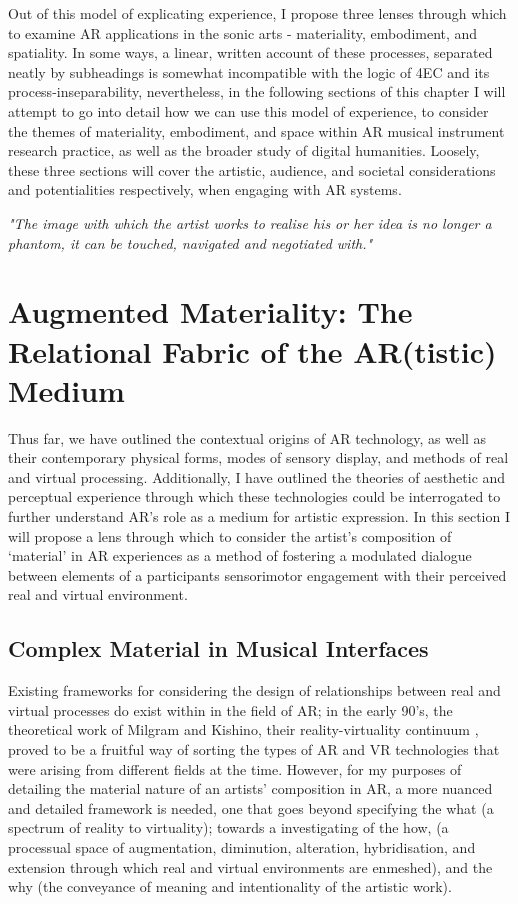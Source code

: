 Out of this model of explicating experience, I propose three lenses through which to examine AR applications in the sonic arts - materiality, embodiment, and spatiality. In some ways, a linear, written account of these processes, separated neatly by subheadings is somewhat incompatible with the logic of 4EC and its process-inseparability, nevertheless, in the following sections of this chapter I will attempt to go into detail how we can use this model of experience, to consider the themes of materiality, embodiment, and space within AR musical instrument research practice, as well as the broader study of digital humanities. Loosely, these three sections will cover the artistic, audience, and societal considerations and potentialities respectively, when engaging with AR systems.



\epigraph{\textit{"The image with which the artist works to realise his or her idea is no longer a phantom, it can be touched, navigated and negotiated with."}}{\citep[p.5]{ryan1991}}

\section[Augmented Materiality]{Augmented Materiality: The Relational Fabric of the AR(tistic) Medium}\label{sec: theory-materiality}
Thus far, we have outlined the contextual origins of AR technology, as well as their contemporary physical forms, modes of sensory display, and methods of real and virtual processing. Additionally, I have outlined the theories of aesthetic and perceptual experience through which these technologies could be interrogated to further understand AR's role as a medium for artistic expression. In this section I will propose a lens through which to consider the artist's composition of `material' in AR experiences as a method of fostering a modulated dialogue between elements of a participants sensorimotor engagement with their perceived real and virtual environment. 

\subsection{Complex Material in Musical Interfaces}\label{sec: theory-materiality-complexitymusic}
Existing frameworks for considering the design of relationships between real and virtual processes do exist within in the field of AR; in the early 90's, the theoretical work of Milgram and Kishino, their reality-virtuality continuum \citeyearpar[p. 10]{milgram1994}, proved to be a fruitful way of sorting the types of AR and VR technologies that were arising from different fields at the time. However, for my purposes of detailing the material nature of an artists' composition in AR, a more nuanced and detailed framework is needed, one that goes beyond specifying the what (a spectrum of reality to virtuality); towards a investigating of the how, (a processual space of augmentation, diminution, alteration, hybridisation, and extension through which real and virtual environments are enmeshed), and the why (the conveyance of meaning and intentionality of the artistic work). 

